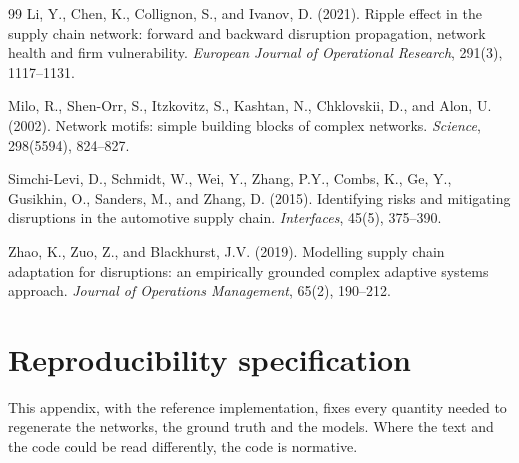 \documentclass{ifacconf}
\begin{document}
\begin{thebibliography}{99}
Li, Y., Chen, K., Collignon, S., and Ivanov, D. (2021).
\newblock Ripple effect in the supply chain network: forward and backward disruption propagation, network health and firm vulnerability.
\newblock \emph{European Journal of Operational Research}, 291(3), 1117--1131.

Milo, R., Shen-Orr, S., Itzkovitz, S., Kashtan, N., Chklovskii, D., and Alon, U. (2002).
\newblock Network motifs: simple building blocks of complex networks.
\newblock \emph{Science}, 298(5594), 824--827.

Simchi-Levi, D., Schmidt, W., Wei, Y., Zhang, P.Y., Combs, K., Ge, Y., Gusikhin, O., Sanders, M., and Zhang, D. (2015).
\newblock Identifying risks and mitigating disruptions in the automotive supply chain.
\newblock \emph{Interfaces}, 45(5), 375--390.

Zhao, K., Zuo, Z., and Blackhurst, J.V. (2019).
\newblock Modelling supply chain adaptation for disruptions: an empirically grounded complex adaptive systems approach.
\newblock \emph{Journal of Operations Management}, 65(2), 190--212.

\end{thebibliography}

\appendix
\section{Reproducibility specification}
\label{app:repro}

This appendix, with the reference implementation, fixes every quantity needed to regenerate the networks, the ground truth and the models. Where the text and the code could be read differently, the code is normative.
\end{document}
